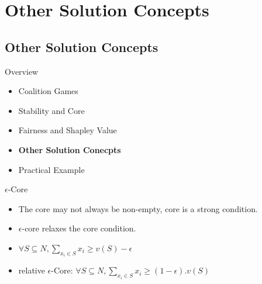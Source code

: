 \documentclass{beamer}
\begin{document}
\section{Other Solution Concepts}
\subsection{Other Solution Concepts}

\begin{frame}{Overview}
    \begin{itemize}
     	\itemsep=.5cm
    	\item Coalition Games
    	\item Stability and Core
    	\item Fairness and Shapley Value
    	\item {\bf Other Solution Conecpts}
        \item Practical Example
    \end{itemize}
\end{frame}

\begin{frame}{$\epsilon$-Core}
    \begin{itemize}
        \item The core may not always be non-empty, core is a strong condition.
        \item $\epsilon$-core relaxes the core condition.
        \item $\forall S \subseteq N, \sum_{x_i \in S} x_i \geq v(S) - \epsilon$
        \item relative $\epsilon$-Core: $\forall S \subseteq N, \sum_{x_i \in S} x_i \geq (1-\epsilon).v(S)$
    \end{itemize}
\end{frame}
\end{document}
